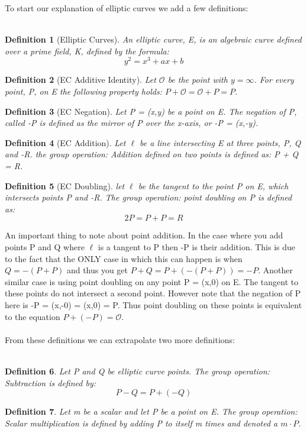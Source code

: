 \documentclass{article}
\newtheorem{definition}{Definition}[section]
\begin{document}
To start our explanation of elliptic curves we add a few definitions:
\\\\
\begin{definition}[Elliptic Curves]
An elliptic curve, E, is an algebraic curve defined over a prime field, K, defined by the formula:
$$y^2 = x^3 + ax + b$$
\end{definition}
\begin{definition}[EC Additive Identity]
Let $\mathcal{O}$ be the point with $y = \infty$. For every point, P, on E the following property holds: $P + \mathcal{O} = \mathcal{O} + P = P$.
\end{definition}
\begin{definition}[EC Negation]
Let P = (x,y) be a point on E. The negation of P, called -P is defined as the mirror of P over the x-axis, or -P = (x,-y).
\end{definition}
\begin{definition}[EC Addition]
Let $\ell$ be a line intersecting E at three points, P, Q and -R. the group operation: Addition defined on two points is defined as: P + Q = R.
\end{definition}
\begin{definition}[EC Doubling]
let $\ell$ be the tangent to the point P on E, which intersects points P and -R. The group operation: point doubling on P is defined as: $$2P = P + P = R$$
\end{definition}
\noindent
An important thing to note about point addition. In the case where you add points P and Q where $\ell$ is a tangent to P then -P is their addition. This is due to the fact that the ONLY case in which this can happen is when $Q = -(P + P)$ and thus you get $P + Q = P + (-(P + P)) = -P$. Another similar case is using point doubling on any point P = (x,0) on E. The tangent to these points do not intersect a second point. However note that the negation of P here is -P = (x,-0) = (x,0) = P. Thus point doubling on these points is equivalent to the equation $P + (-P) = \mathcal{O}$.
\\\\
From these definitions we can extrapolate two more definitions:
\\\\
\begin{definition}
Let P and Q be elliptic curve points. The group operation: Subtraction is defined by:
$$P-Q = P + (-Q)$$
\end{definition}
\begin{definition}
Let m be a scalar and let P be a point on E. The group operation: Scalar multiplication is defined by adding P to itself m times and denoted a $m\cdot P$.
\end{definition}
\end{document}
